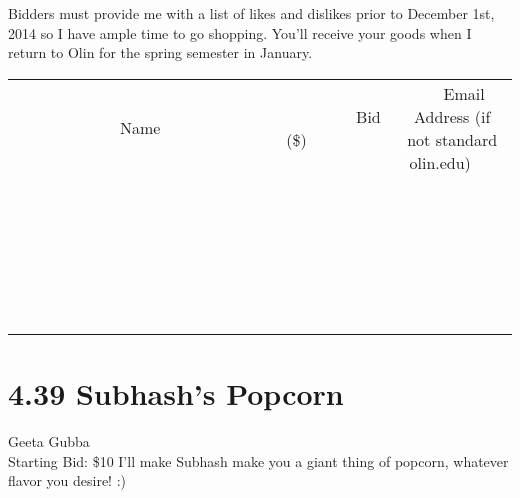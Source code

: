 \documentclass[11pt]{article}
\begin{document}
Bidders must provide me with a list of likes and dislikes prior to December 1st, 2014 so I have ample time to go shopping. You'll receive your goods when I return to Olin for the spring semester in January.
\\[6ex]
\begin{tabular}{c c c}
~~~~~~~~~~~~~Name~~~~~~~~~~~~~ & ~~~~~~~~~Bid (\$)~~~~~~~~~  & ~~~Email Address (if not standard olin.edu)~~~\\
 & & \\
\hline
 & & \\
\hline
 & & \\
\hline
 & & \\
\hline
 & & \\
\hline
 & & \\
\hline
 & & \\
\hline
 & & \\
\hline
 & & \\
\hline
 & & \\
\hline
 & & \\
\hline
 & & \\
\hline
 & & \\
\hline
 & & \\
\hline
 & & \\
\hline
 & & \\
\hline
 & & \\
\hline
 & & \\
\hline
 & & \\
\hline
 & & \\
\hline
 & & \\
\hline
 & & \\
\hline
 & & \\
\hline
 & & \\
\hline
 & & \\
\hline
 & & \\
\hline
\end{tabular}
\newpage
\section*{4.39 Subhash's Popcorn}
Geeta Gubba
\\
Starting Bid: \$10
\newline
I'll make Subhash make you a giant thing of popcorn, whatever flavor you desire! :)
\end{document}
